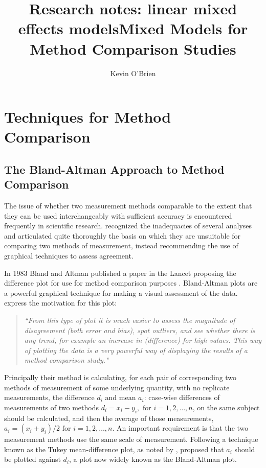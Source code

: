 \documentclass[12pt, a4paper]{report}
\title{Research notes: linear mixed effects models}
\author{ } \date{ }
\theoremstyle{plain}
\theoremstyle{definition}
\theoremstyle{remark}
\begin{document}
	\author{Kevin O'Brien}
	\title{Mixed Models for Method Comparison Studies}
	\tableofcontents
	
	\newpage
	\chapter{Techniques for Method Comparison}
	\section{The Bland-Altman Approach to Method Comparison}
	
The issue of whether two measurement methods comparable to the 	extent that they can be used interchangeably with sufficient accuracy is encountered frequently in scientific research. \citet{BA83} recognized the inadequacies of several analyses and articulated quite thoroughly the basis on which they are unsuitable for comparing two methods of measurement, instead recommending the use of graphical techniques to assess agreement. 



	
In 1983 Bland and Altman published a paper in the Lancet proposing the difference plot for use for method comparison purposes \citep{BA83}. 	Bland-Altman plots are a powerful graphical technique for making
a visual assessment of the data. \citet*{BA83} express the
motivation for this plot:
\begin{quote}
\textit{
	``From this type of plot it is much easier to assess the magnitude
	of disagreement (both error and bias), spot outliers, and see
	whether there is any trend, for example an increase in
	(difference) for high values. This way of plotting the data is a
	very powerful way of displaying the results of a method comparison
	study."}
\end{quote}
 Principally their method is calculating, for each pair of corresponding two methods of measurement of some underlying quantity, with no replicate measurements, the difference $d_i$ and mean $a_i$: case-wise differences of measurements of two methods $d_{i} = x_{i}-y_{i}, \mbox{ for }i=1,2,\dots,n$, on the same subject should be calculated, and then the average of those measurements, $a_{i} = (x_{i} + y_{i})/2 \mbox{ for }i=1,2,\dots, n$. An important requirement is that the two measurement methods use the same scale of measurement. Following a technique known as the Tukey mean-difference plot, as noted by \citet{kozak2014including}, \citet{BA83} proposed that $a_i$ should be plotted against $d_i$, a plot now widely known as the Bland-Altman plot.
\end{document}
